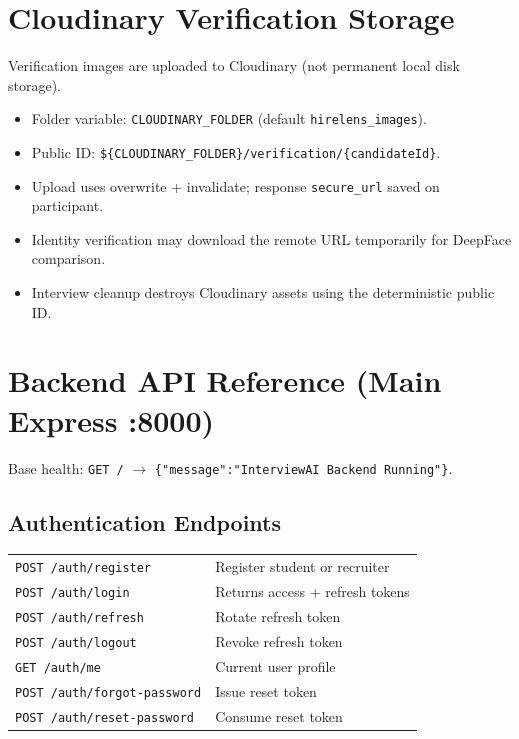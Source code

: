 \documentclass[11pt,a4paper]{report}
\begin{document}
\chapter{Cloudinary Verification Storage}

Verification images are uploaded to Cloudinary (not permanent local disk storage).

\begin{itemize}
  \item Folder variable: \texttt{CLOUDINARY\_FOLDER} (default \texttt{hirelens\_images}).
  \item Public ID: \texttt{\$\{CLOUDINARY\_FOLDER\}/verification/\{candidateId\}}.
  \item Upload uses overwrite + invalidate; response \texttt{secure\_url} saved on participant.
  \item Identity verification may download the remote URL temporarily for DeepFace comparison.
  \item Interview cleanup destroys Cloudinary assets using the deterministic public ID.
\end{itemize}

\chapter{Backend API Reference (Main Express :8000)}

Base health: \texttt{GET /} $\rightarrow$ \texttt{\{"message":"InterviewAI Backend Running"\}}.

\section{Authentication Endpoints}
\begin{tabularx}{\textwidth}{@{}lX@{}}
\toprule
\texttt{POST /auth/register} & Register student or recruiter \\
\texttt{POST /auth/login} & Returns access + refresh tokens \\
\texttt{POST /auth/refresh} & Rotate refresh token \\
\texttt{POST /auth/logout} & Revoke refresh token \\
\texttt{GET /auth/me} & Current user profile \\
\texttt{POST /auth/forgot-password} & Issue reset token \\
\texttt{POST /auth/reset-password} & Consume reset token \\
\bottomrule
\end{tabularx}
\end{document}
